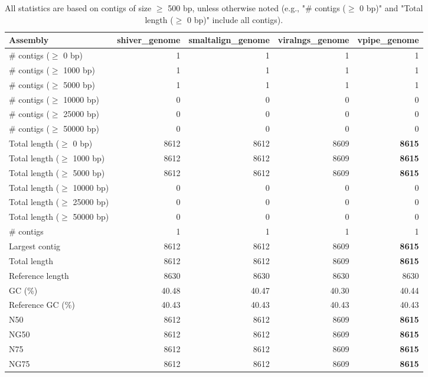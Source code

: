 \documentclass[12pt,a4paper]{article}
\begin{document}
\begin{table}[ht]
\begin{center}
\caption{All statistics are based on contigs of size $\geq$ 500 bp, unless otherwise noted (e.g., "\# contigs ($\geq$ 0 bp)" and "Total length ($\geq$ 0 bp)" include all contigs).}
\begin{tabular}{|l*{4}{|r}|}
\hline
Assembly & shiver\_genome & smaltalign\_genome & viralngs\_genome & vpipe\_genome \\ \hline
\# contigs ($\geq$ 0 bp) & 1 & 1 & 1 & 1 \\ \hline
\# contigs ($\geq$ 1000 bp) & 1 & 1 & 1 & 1 \\ \hline
\# contigs ($\geq$ 5000 bp) & 1 & 1 & 1 & 1 \\ \hline
\# contigs ($\geq$ 10000 bp) & 0 & 0 & 0 & 0 \\ \hline
\# contigs ($\geq$ 25000 bp) & 0 & 0 & 0 & 0 \\ \hline
\# contigs ($\geq$ 50000 bp) & 0 & 0 & 0 & 0 \\ \hline
Total length ($\geq$ 0 bp) & 8612 & 8612 & 8609 & {\bf 8615} \\ \hline
Total length ($\geq$ 1000 bp) & 8612 & 8612 & 8609 & {\bf 8615} \\ \hline
Total length ($\geq$ 5000 bp) & 8612 & 8612 & 8609 & {\bf 8615} \\ \hline
Total length ($\geq$ 10000 bp) & 0 & 0 & 0 & 0 \\ \hline
Total length ($\geq$ 25000 bp) & 0 & 0 & 0 & 0 \\ \hline
Total length ($\geq$ 50000 bp) & 0 & 0 & 0 & 0 \\ \hline
\# contigs & 1 & 1 & 1 & 1 \\ \hline
Largest contig & 8612 & 8612 & 8609 & {\bf 8615} \\ \hline
Total length & 8612 & 8612 & 8609 & {\bf 8615} \\ \hline
Reference length & 8630 & 8630 & 8630 & 8630 \\ \hline
GC (\%) & 40.48 & 40.47 & 40.30 & 40.44 \\ \hline
Reference GC (\%) & 40.43 & 40.43 & 40.43 & 40.43 \\ \hline
N50 & 8612 & 8612 & 8609 & {\bf 8615} \\ \hline
NG50 & 8612 & 8612 & 8609 & {\bf 8615} \\ \hline
N75 & 8612 & 8612 & 8609 & {\bf 8615} \\ \hline
NG75 & 8612 & 8612 & 8609 & {\bf 8615} \\ \hline

\end{tabular}
\end{center}
\end{table}
\end{document}
